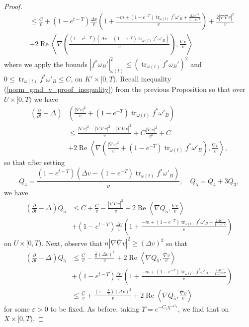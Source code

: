 \documentclass[10pt,a4paper]{amsart}
\DeclareMathOperator{\Real}{Re}
\DeclareMathOperator{\tr}{tr}
\newcommand{\e}{\varepsilon}
\newcommand{\ip}[1]{\left\langle#1\right\rangle}
\newcommand{\oo}[1]{\overline{#1}}
\newcommand{\parabolic}[1]{\left(\frac{\d}{\d t} - \Delta_{#1}\right)}
\renewcommand{\d}{\partial}
\begin{document}
\begin{proof}
\begin{align*}
    &\leq \frac{C}{v} + (1-e^{t-T}) \frac{\Delta v }{v} \left(1+\frac{-m+(1-e^{-T})\tr_{\omega(t)}f^*\omega'_B + \frac{2A e^{-t}}{1-e^{-T}}}{v}\right)+\frac{2|\nabla \oo{\nabla} v|^2}{v}\\
    &+ 2\Real \ip{\nabla \left(\frac{(1-e^{t-T})(\Delta v - (1-e^{-T})\tr_{\omega(t)} f^*\omega'_B)}{v}\right), \frac{\oo{\nabla} v}{v}}
\end{align*}
where we apply the bounds $|f^*\omega_B'|_{\omega(t)}^2 \leq (\tr_{\omega(t)}f^*\omega_B')^2$ and $0 \leq \tr_{\omega(t)} f^*\omega'_B \leq C$, on $K' \times [0,T)$. Recall inequality (\ref{norm_grad_v_proof_inequality}) from the previous Proposition so that over $U \times [0,T)$ we have
\begin{align*}
    \parabolic{}&\left(\frac{|\nabla v|^2}{v} + (1-e^{-T})\tr_{\omega(t)} f^*\omega'_B\right)\\
    &\leq \frac{|\nabla v|^2 - |\nabla \nabla v|^2 - |\nabla \oo{\nabla} v|^2}{v}+ C\frac{|\nabla v|^2}{v^2} + C\\
    &+ 2 \Real \ip{\nabla \left(\frac{|\nabla v|^2}{v}+ (1-e^{-T})\tr_{\omega(t)} f^*\omega'_B \right), \frac{\oo{\nabla} v}{v}},
\end{align*}
so that after setting 
\begin{equation*}
    Q_4 = \frac{(1-e^{t-T})(\Delta v - (1-e^{-T})\tr_{\omega(t)} f^*\omega'_B)}{v}, \quad Q_5 = Q_4 + 3 Q_3,
\end{equation*}
we have
\begin{align*}
    \parabolic{}Q_5 &\leq C + \frac{C}{v}-\frac{|\nabla \oo{\nabla} v|^2}{v} + 2\Real \ip{\nabla Q_5, \frac{\oo{\nabla} v}{v}}\\
    &+(1-e^{t-T}) \frac{\Delta v }{v} \left(1 + \frac{-m+(1-e^{-T})\tr_{\omega(t)}f^*\omega'_B + \frac{2A e^{-t}}{1-e^{-T}}}{v}\right)
\end{align*}
on $U \times [0,T)$. Next, observe that $n|\nabla \oo{\nabla} v|^2 \geq (\Delta v)^2$ so that
\begin{align*}
    \parabolic{} Q_5 &\leq \frac{C}{v} -\frac{\frac{1}{n}(\Delta v)^2}{v} + 2\Real \ip{\nabla Q_5, \frac{\oo{\nabla} v}{v}}\\
    &+ (1-e^{t-T}) \frac{\Delta v }{v} \left(1+\frac{-m+(1-e^{-T})\tr_{\omega(t)}f^*\omega'_B + \frac{2A e^{-t}}{1-e^{-T}}}{v}\right)\\
    &\leq \frac{C}{v} + \frac{(\e-\frac{1}{n})(\Delta v)^2}{v} + 2 \Real \ip{\nabla Q_5, \frac{\oo{\nabla} v}{v}}
\end{align*}
for some $\e > 0$ to be fixed. As before, taking $\Upsilon = e^{-C_1\chi^{-C_2}}$, we find that on $X \times [0,T)$,

\end{proof}
\end{document}
